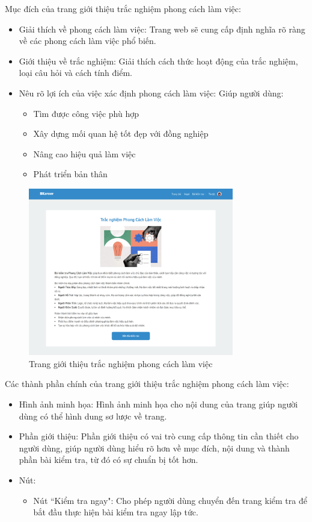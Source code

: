 Mục đích của trang giới thiệu trắc nghiệm phong cách làm việc:
\begin{itemize}
    \item Giải thích về phong cách làm việc: Trang web sẽ cung cấp định nghĩa rõ ràng về các phong cách làm việc phổ biến.
    \item Giới thiệu về trắc nghiệm: Giải thích cách thức hoạt động của trắc nghiệm, loại câu hỏi và cách tính điểm.
    \item Nêu rõ lợi ích của việc xác định phong cách làm việc: Giúp người dùng:
        \begin{itemize}
            \item Tìm được công việc phù hợp
            \item Xây dựng mối quan hệ tốt đẹp với đồng nghiệp
            \item Nâng cao hiệu quả làm việc
            \item Phát triển bản thân
        \end{itemize}
\end{itemize}

\begin{figure}[H]
    \centering
    \includegraphics[width=0.8\textwidth]
    {images/chap5/workStyleDetail.png}
    \vspace{0.5cm}
    \caption{Trang giới thiệu trắc nghiệm phong cách làm việc}
\end{figure}

Các thành phần chính của trang giới thiệu trắc nghiệm phong cách làm việc:
\begin{itemize}
    \item Hình ảnh minh họa: Hình ảnh minh họa cho nội dung của trang giúp người dùng có thể hình dung sơ lược về trang.
    \item Phần giới thiệu: Phần giới thiệu có vai trò cung cấp thông tin cần thiết cho người dùng, giúp người dùng hiểu rõ hơn về mục đích, nội dung và thành phần bài kiểm tra, từ đó có sự chuẩn bị tốt hơn.
    \item Nút:
        \begin{itemize}
            \item Nút ``Kiểm tra ngay": Cho phép người dùng chuyển đến trang kiểm tra để bắt đầu thực hiện bài kiểm tra ngay lập tức.
        \end{itemize}
\end{itemize}



